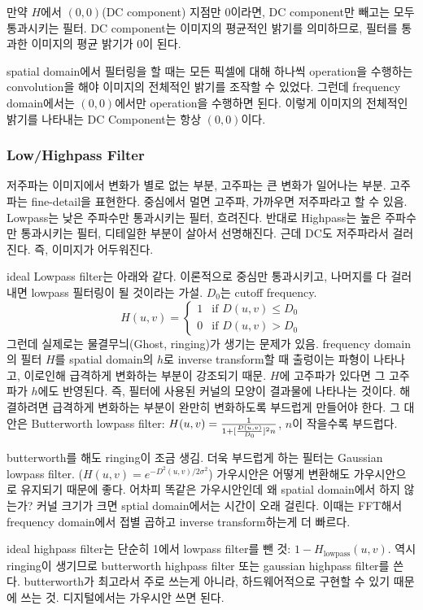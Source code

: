 만약 $H$에서 $(0, 0)$(DC component) 지점만 0이라면, DC component만 빼고는 모두 통과시키는 필터. DC component는 이미지의 평균적인 밝기를 의미하므로, 필터를 통과한 이미지의 평균 밝기가 0이 된다.

spatial domain에서 필터링을 할 때는 모든 픽셀에 대해 하나씩 operation을 수행하는 convolution을 해야 이미지의 전체적인 밝기를 조작할 수 있었다. 그런데 frequency domain에서는 $(0, 0)$에서만 operation을 수행하면 된다. 이렇게 이미지의 전체적인 밝기를 나타내는 DC Component는 항상 $(0, 0)$이다.

\subsubsection{Low/Highpass Filter}

저주파는 이미지에서 변화가 별로 없는 부분, 고주파는 큰 변화가 일어나는 부분. 고주파는 fine-detail을 표현한다. 중심에서 멀면 고주파, 가까우면 저주파라고 할 수 있음. Lowpass는 낮은 주파수만 통과시키는 필터, 흐려진다. 반대로 Highpass는 높은 주파수만 통과시키는 필터, 디테일한 부분이 살아서 선명해진다. 근데 DC도 저주파라서 걸러진다. 즉, 이미지가 어두워진다.

ideal Lowpass filter는 아래와 같다. 이론적으로 중심만 통과시키고, 나머지를 다 걸러내면 lowpass 필터링이 될 것이라는 가설. $D_0$는 cutoff frequency.
$$
H(u, v) =
\begin{cases}
  1 & \text{if } D(u, v) \leq D_0 \\
  0 & \text{if } D(u, v) > D_0
\end{cases}
$$
그런데 실제로는 물결무늬(Ghost, ringing)가 생기는 문제가 있음. frequency domain의 필터 $H$를 spatial domain의 $h$로 inverse transform할 때 출렁이는 파형이 나타나고, 이로인해 급격하게 변화하는 부분이 강조되기 때문. $H$에 고주파가 있다면 그 고주파가 $h$에도 반영된다. 즉, 필터에 사용된 커널의 모양이 결과물에 나타나는 것이다. 해결하려면 급격하게 변화하는 부분이 완만히 변화하도록 부드럽게 만들어야 한다. 그 대안은 Butterworth lowpass filter: $H(u, v) = {1 \over 1 + [{D(u, v) \over D_0}]^2n}$, $n$이 작을수록 부드럽다.

butterworth를 해도 ringing이 조금 생김. 더욱 부드럽게 하는 필터는 Gaussian lowpass filter. ($H(u, v) = e^{-D^2 (u, v) / 2\sigma^2}$) 가우시안은 어떻게 변환해도 가우시안으로 유지되기 때문에 좋다. 어차피 똑같은 가우시안인데 왜 spatial domain에서 하지 않는가? 커널 크기가 크면 sptial domain에서는 시간이 오래 걸린다. 이때는 FFT해서 frequency domain에서 접별 곱하고 inverse transform하는게 더 빠르다.

ideal highpass filter는 단순히 1에서 lowpass filter를 뺀 것: $1 - H_\text{lowpass}(u, v)$. 역시 ringing이 생기므로 butterworth highpass filter 또는 gaussian highpass filter를 쓴다. butterworth가 최고라서 주로 쓰는게 아니라, 하드웨어적으로 구현할 수 있기 때문에 쓰는 것. 디지털에서는 가우시안 쓰면 된다.

